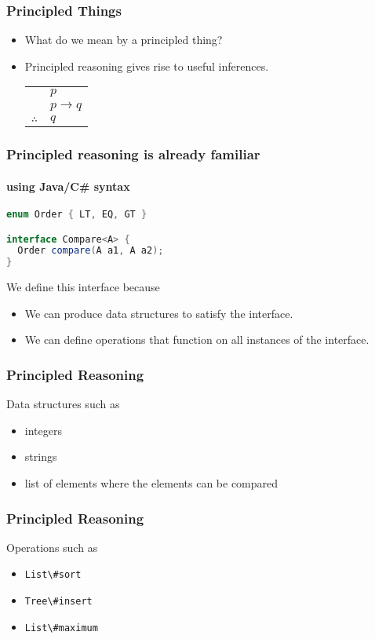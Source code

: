 \begin{frame}
\frametitle{Principled Things}
\begin{itemize}
\item<1-> What do we mean by a principled thing?
\item<2-> Principled reasoning gives rise to useful inferences.
\begin{center}
\begin{tabular}{c@{\,}l@{}} 
  & $p$ \\
  & $p \to q$ \\\cline{2-2}
  $\therefore$         
  & $q$ \\
\end{tabular}
\end{center}
\end{itemize}
\end{frame}

\begin{frame}[fragile]
\frametitle{Principled reasoning is already familiar}
\framesubtitle{using Java/C\# syntax}
\begin{lstlisting}[style=language,language=java]
enum Order { LT, EQ, GT }

interface Compare<A> {
  Order compare(A a1, A a2);
}
\end{lstlisting}
\begin{block}{We define this interface because}
\begin{itemize}
\item We can produce data structures to satisfy the interface.
\item We can define operations that function on all instances of the interface.
\end{itemize}
\end{block}
\end{frame}

\begin{frame}
\frametitle{Principled Reasoning}
\begin{block}{Data structures such as}
\begin{itemize}
\item integers
\item strings
\item list of elements where the elements can be compared
\end{itemize}
\end{block}
\end{frame}

\begin{frame}
\frametitle{Principled Reasoning}
\begin{block}{Operations such as}
\begin{itemize}
\item \lstinline{List\#sort}
\item \lstinline{Tree\#insert}
\item \lstinline{List\#maximum}
\end{itemize}
\end{block}
\end{frame}

